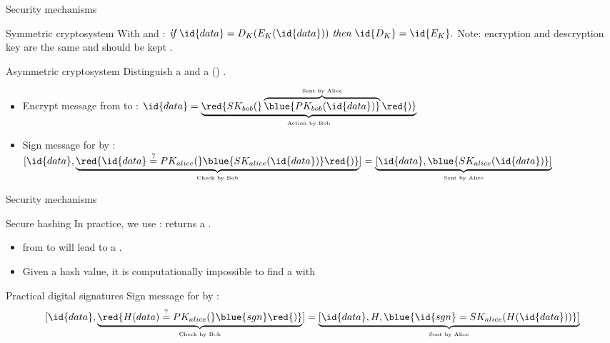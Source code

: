 \begin{slide}{Security mechanisms}
  \begin{block}{Symmetric cryptosystem}
    With  and :
    \(
    \mbox{\itshape if\ } \id{data} = D_K(E_K(\id{data})) \mbox{\itshape \ then\ } \id{D_K} = \id{E_K}.
    \)
    Note: encryption and descryption key are the same and should be kept .
  \end{block}
  \begin{block}{Asymmetric cryptosystem}
    Distinguish a   and a  ()
     .
    \begin{itemize}\tightlist
    \item Encrypt message from  to :
      \(
      \id{data} =
      \underbrace{%
        \red{SK_{bob}(}\overbrace{%
          \blue{PK_{bob}(\id{data})}
        }^{\mbox{\tiny Sent by Alice}}\red{)}
      }_{\mbox{\tiny Action by Bob}}
      \)
    \item Sign message for  by :
      \(
        [\id{data}, \underbrace{%
            \red{\id{data}\stackrel{?}{=}PK_{alice}(}\blue{SK_{alice}(\id{data})}\red{)}
          }_{\mbox{\tiny Check by Bob}}
        ] =
        \underbrace{%
          [\id{data}, \blue{SK_{alice}(\id{data})}]
        }_{\mbox{\tiny Sent by Alice}}
      \)
    \end{itemize}
  \end{block}
\end{slide}
\begin{slide}{Security mechanisms}
  \begin{block}{Secure hashing}
    In practice, we use :  returns a . \vspace*{-6pt}
    \begin{itemize}\tightlist
    \item {} from  to  will lead to a 
      .
    \item Given a hash value, it is computationally impossible to find a  with 
    \end{itemize}
  \end{block}
  \begin{block}{Practical digital signatures}
    Sign message for  by :
      \[
        [\id{data}, \underbrace{%
            \red{H(data)\stackrel{?}{=}PK_{alice}(}\blue{sgn}\red{)}
          }_{\mbox{\tiny Check by Bob}}
        ] =
        \underbrace{%
          [\id{data}, H, \blue{\id{sgn} = SK_{alice}(H(\id{data}))}]
        }_{\mbox{\tiny Sent by Alice}}
      \]
  \end{block}

\end{slide}
